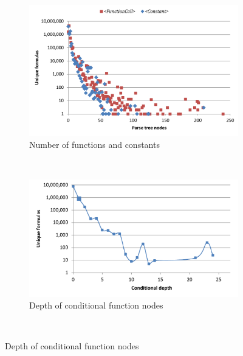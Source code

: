 \documentclass[times]{smrauth}
\begin{document}
 \begin{figure}
 	\centering
 	
 	 	\begin{subfigure}[b]{0.49\textwidth}
 	 		\centering 
 	 		\includegraphics[width=1\textwidth]{img/freqsBasic}
 	 		\caption{Number of functions and constants}
 	 		\label{fig:freqsBasic}
 	 	\end{subfigure}
 	 	~
 	\begin{subfigure}[b]{0.49\textwidth}
 		\centering
 		\includegraphics[width=1\textwidth]{img/depths4}
 		\caption{Depth of conditional function nodes}
 		\label{fig:depthConditional}
 	\end{subfigure}
 	~
 	

\end{figure}
\end{document}
